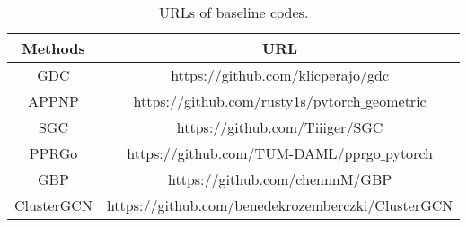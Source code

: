 \begin{table}[t]
	\tblcapup
	\caption{URLs of baseline codes.}
	\vspace{-3mm}
	\tblcapdown
	\begin{small}
			
		\begin{tabular}{|c|c|}\hline
    {\bf Methods} & {\bf URL} \\ \hline
    GDC & https://github.com/klicperajo/gdc \\
    APPNP & https://github.com/rusty1s/pytorch$\_$geometric \\
    SGC & https://github.com/Tiiiger/SGC \\ 
    PPRGo & https://github.com/TUM-DAML/pprgo$\_$pytorch \\ 
    GBP & https://github.com/chennnM/GBP \\ 
    ClusterGCN &https://github.com/benedekrozemberczki/ClusterGCN \\ \hline
	\end{tabular}
	\end{small}
	\label{tbl:url}
\end{table}


